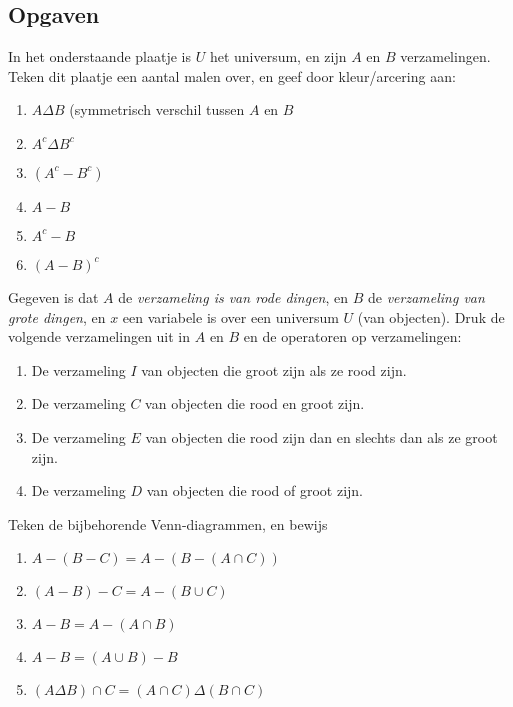 \subsection{Opgaven}
\begin{exercise}
In het onderstaande plaatje is $U$ het universum, en zijn $A$ en $B$ verzamelingen. Teken dit plaatje een aantal malen over, en geef door kleur/arcering aan:
\begin{enumerate}[label=\textbf{\alph*.}]
    \item $A\Delta B$ (symmetrisch verschil tussen $A$ en $B$
    \item $A^c\Delta B^c$
    \item $(A^c-B^c)$
    \item $A-B$
    \item $A^c-B$
    \item $(A-B)^c$
\end{enumerate}
\end{exercise}

\begin{exercise}
Gegeven is dat $A$ de \textit{verzameling is van rode dingen}, en $B$ de \textit{verzameling van grote dingen}, en $x$ een variabele is over een universum $U$ (van objecten). Druk de volgende verzamelingen uit in $A$ en $B$ en de operatoren op verzamelingen:
\begin{enumerate}[label=\textit{\alph*.}]
    \item De verzameling $I$ van objecten die groot zijn als ze rood zijn.
    \item De verzameling $C$ van objecten die rood en groot zijn.
    \item De verzameling $E$ van objecten die rood zijn dan en slechts dan als ze groot zijn.
    \item De verzameling $D$ van objecten die rood of groot zijn.
\end{enumerate}
\end{exercise}

\begin{exercise}
Teken de bijbehorende Venn-diagrammen, en bewijs
\begin{enumerate}[label=\textit{\alph*.}]
    \item $A-(B-C)=A-(B-(A\cap C))$
    \item $(A-B)-C=A-(B\cup C)$
    \item $A-B=A-(A\cap B)$
    \item $A-B=(A\cup B)-B$
    \item $(A\Delta B)\cap C=(A\cap C)\Delta(B\cap C)$
\end{enumerate}
\end{exercise}

